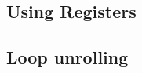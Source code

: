 

\subsection{Using Registers}



\subsection{Loop unrolling}\label{sec:loopUnrolling}















